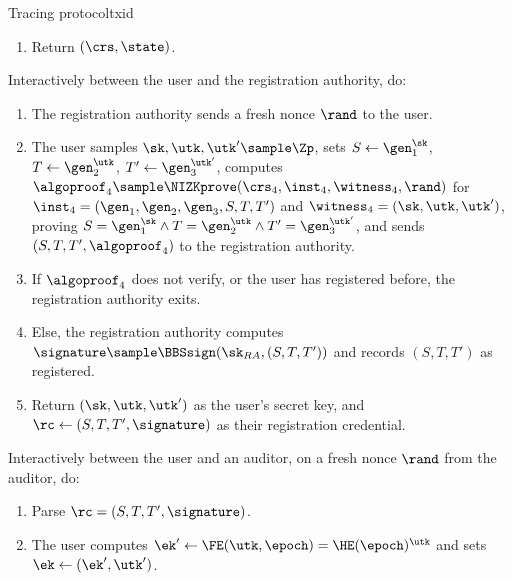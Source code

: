 \begin{protocolbox}{Tracing protocol}{txid}
\begin{description}
\begin{enumerate}
        \item Return $(\crs,\state)$.

      \end{enumerate}

    \item[$(\sk,\rc) \sample \IDregister(\crs,\state)$ :] Interactively between
      the user and the registration authority, do:

      \begin{enumerate}

        \item The registration authority sends a fresh nonce $\rand$ to the
          user.

        \item The user samples $\sk,\utk,\utk' \sample \Zp$, sets $S \leftarrow
          \gen_1^{\sk}$, $T \leftarrow \gen_2^{\utk}$, $T' \leftarrow
          \gen_3^{\utk'}$, computes $\algoproof_4 \sample
          \NIZKprove(\crs_4,\inst_4,\witness_4,\rand)$ for $\inst_4 =
          (\gen_1,\gen_2,\gen_3,S,T,T')$ and $\witness_4 = (\sk,\utk,\utk')$,
          proving $S = \gen_1^{\sk} \wedge T = \gen_2^{\utk} \wedge T' =
          \gen_3^{\utk'}$, and sends $(S,T,T',\algoproof_4)$ to the
          registration authority.

        \item If $\algoproof_4$ does not verify, or the user has registered
          before, the registration authority exits.

        \item Else, the registration authority computes $\signature \sample
          \BBSsign(\sk_{RA},(S,T,T'))$ and records $(S,T,T')$ as registered.

        \item Return $(\sk,\utk,\utk')$ as the user's secret key, and $\rc
          \leftarrow (S,T,T',\signature)$ as their registration credential.

      \end{enumerate}

    \item[$\ek \sample \IDgrant(\crs,\sk,\utk,\utk',\rc,\epoch)$ :]
      Interactively between the user and an auditor, on a fresh nonce $\rand$
      from the auditor, do:

      \begin{enumerate}

        \item Parse $\rc = (S,T,T',\signature)$.

        \item The user computes $\ek' \leftarrow \FE(\utk,\epoch) =
          \HE(\epoch)^{\utk}$ and sets $\ek \leftarrow (\ek',\utk')$.


\end{enumerate}
\end{description}
\end{protocolbox}
